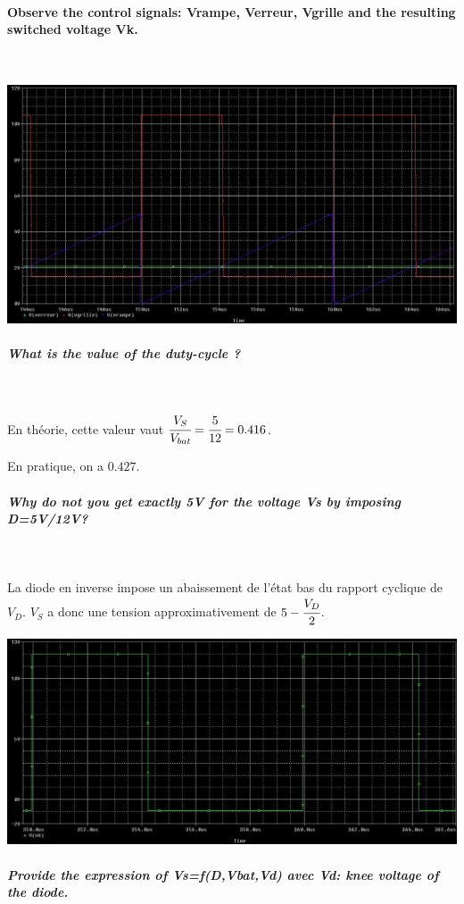 \documentclass{article}
\begin{document}
\newpage

\paragraph{Observe the control signals: Vrampe, Verreur, Vgrille and the resulting switched voltage Vk.}

~

\includegraphics[width=\linewidth]{commandes.png}

\subparagraph{What is the value of the duty-cycle ?}

~

En théorie, cette valeur vaut $\cfrac{V_S}{V_{bat}} = \cfrac{5}{12} = 0.416$.

En pratique, on a $0.427$.

\subparagraph{Why do not you get exactly 5V for the voltage Vs by imposing D=5V/12V?}

~

La diode en inverse impose un abaissement de l’état bas du rapport cyclique de $V_D$. $V_S$ a donc une tension approximativement de $5-\cfrac{V_D}{2}$.


\includegraphics[width=\linewidth]{vk.png}

\subparagraph{Provide the expression of Vs=f(D,Vbat,Vd) avec Vd: knee voltage of the diode.}
\end{document}
